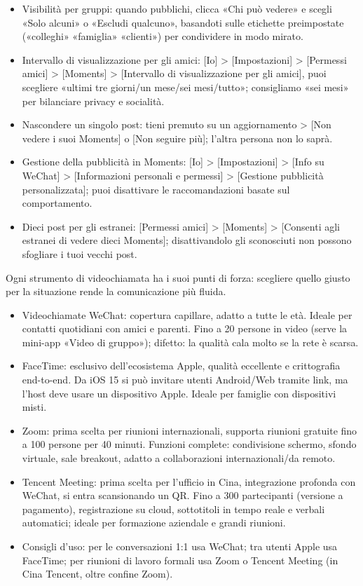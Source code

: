 
\begin{itemize}
  \item Visibilità per gruppi: quando pubblichi, clicca «Chi può vedere» e scegli «Solo alcuni» o «Escludi qualcuno», basandoti sulle etichette preimpostate («colleghi» «famiglia» «clienti») per condividere in modo mirato.
  \item Intervallo di visualizzazione per gli amici: [Io] > [Impostazioni] > [Permessi amici] > [Moments] > [Intervallo di visualizzazione per gli amici], puoi scegliere «ultimi tre giorni/un mese/sei mesi/tutto»; consigliamo «sei mesi» per bilanciare privacy e socialità.
  \item Nascondere un singolo post: tieni premuto su un aggiornamento > [Non vedere i suoi Moments] o [Non seguire più]; l'altra persona non lo saprà.
  \item Gestione della pubblicità in Moments: [Io] > [Impostazioni] > [Info su WeChat] > [Informazioni personali e permessi] > [Gestione pubblicità personalizzata]; puoi disattivare le raccomandazioni basate sul comportamento.
  \item Dieci post per gli estranei: [Permessi amici] > [Moments] > [Consenti agli estranei di vedere dieci Moments]; disattivandolo gli sconosciuti non possono sfogliare i tuoi vecchi post.
\end{itemize}


Ogni strumento di videochiamata ha i suoi punti di forza: scegliere quello giusto per la situazione rende la comunicazione più fluida.

\begin{itemize}
  \item Videochiamate WeChat: copertura capillare, adatto a tutte le età. Ideale per contatti quotidiani con amici e parenti. Fino a 20 persone in video (serve la mini-app «Video di gruppo»); difetto: la qualità cala molto se la rete è scarsa.
  \item FaceTime: esclusivo dell'ecosistema Apple, qualità eccellente e crittografia end-to-end. Da iOS 15 si può invitare utenti Android/Web tramite link, ma l'host deve usare un dispositivo Apple. Ideale per famiglie con dispositivi misti.
  \item Zoom: prima scelta per riunioni internazionali, supporta riunioni gratuite fino a 100 persone per 40 minuti. Funzioni complete: condivisione schermo, sfondo virtuale, sale breakout, adatto a collaborazioni internazionali/da remoto.
  \item Tencent Meeting: prima scelta per l'ufficio in Cina, integrazione profonda con WeChat, si entra scansionando un QR. Fino a 300 partecipanti (versione a pagamento), registrazione su cloud, sottotitoli in tempo reale e verbali automatici; ideale per formazione aziendale e grandi riunioni.
  \item Consigli d'uso: per le conversazioni 1:1 usa WeChat; tra utenti Apple usa FaceTime; per riunioni di lavoro formali usa Zoom o Tencent Meeting (in Cina Tencent, oltre confine Zoom).
\end{itemize}

